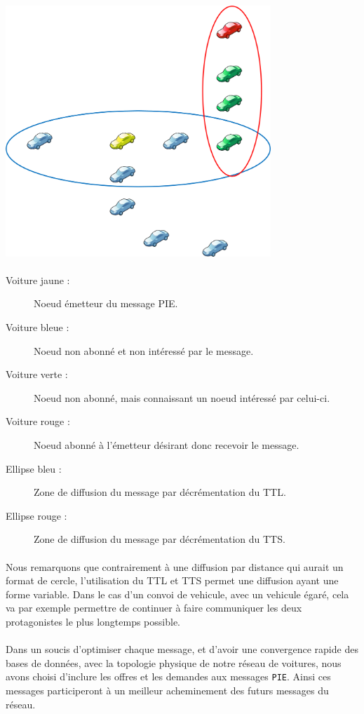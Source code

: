 \begin{center}
	\includegraphics[width=0.75\textwidth]{img/schema2}
\end{center}

\paragraph*{}
\begin{description}
	\item[Voiture jaune :] Noeud émetteur du message PIE.
	\item[Voiture bleue :] Noeud non abonné et non intéressé par le message.
	\item[Voiture verte :] Noeud non abonné, mais connaissant un noeud intéressé par celui-ci.
	\item[Voiture rouge :] Noeud abonné à l'émetteur désirant donc recevoir le message.
	\item[Ellipse bleu :] Zone de diffusion du message par décrémentation du TTL.
	\item[Ellipse rouge :] Zone de diffusion du message par décrémentation du TTS.
\end{description}
\paragraph*{}
Nous remarquons que contrairement à une diffusion par distance qui aurait un format de cercle, l'utilisation du TTL et TTS permet une diffusion ayant une forme variable. Dans le cas d'un convoi de vehicule, avec un vehicule égaré, cela va par exemple permettre de continuer à faire communiquer les deux protagonistes le plus longtemps possible.


\paragraph*{}
Dans un soucis d'optimiser chaque message, et d'avoir une convergence rapide des bases de données, avec la topologie physique de notre réseau de voitures, nous avons choisi d'inclure les offres et les demandes aux messages \texttt{PIE}. Ainsi ces messages participeront à un meilleur acheminement des futurs messages du réseau.
